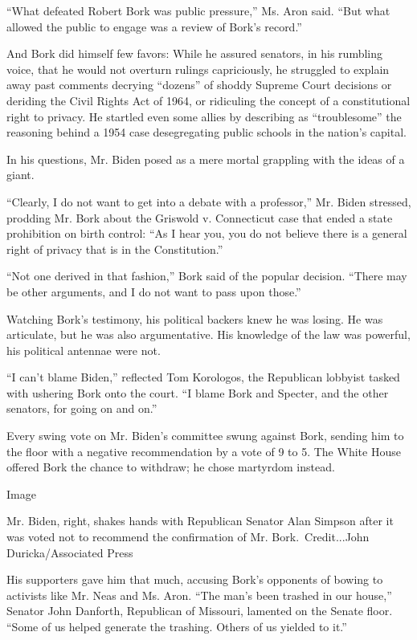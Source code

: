 ``What defeated Robert Bork was public pressure,'' Ms. Aron said. ``But
what allowed the public to engage was a review of Bork's record.''

And Bork did himself few favors: While he assured senators, in his
rumbling voice, that he would not overturn rulings capriciously, he
struggled to explain away past comments decrying ``dozens'' of shoddy
Supreme Court decisions or deriding the Civil Rights Act of 1964, or
ridiculing the concept of a constitutional right to privacy. He startled
even some allies by describing as ``troublesome'' the reasoning behind a
1954 case desegregating public schools in the nation's capital.

In his questions, Mr. Biden posed as a mere mortal grappling with the
ideas of a giant.

``Clearly, I do not want to get into a debate with a professor,'' Mr.
Biden stressed, prodding Mr. Bork about the Griswold v. Connecticut case
that ended a state prohibition on birth control: ``As I hear you, you do
not believe there is a general right of privacy that is in the
Constitution.''

``Not one derived in that fashion,'' Bork said of the popular decision.
``There may be other arguments, and I do not want to pass upon those.''

Watching Bork's testimony, his political backers knew he was losing. He
was articulate, but he was also argumentative. His knowledge of the law
was powerful, his political antennae were not.

``I can't blame Biden,'' reflected Tom Korologos, the Republican
lobbyist tasked with ushering Bork onto the court. ``I blame Bork and
Specter, and the other senators, for going on and on.''

Every swing vote on Mr. Biden's committee swung against Bork, sending
him to the floor with a negative recommendation by a vote of 9 to 5. The
White House offered Bork the chance to withdraw; he chose martyrdom
instead.

Image

Mr. Biden, right, shakes hands with Republican Senator Alan Simpson
after it was voted not to recommend the confirmation of Mr.
Bork.~Credit...John Duricka/Associated Press

His supporters gave him that much, accusing Bork's opponents of bowing
to activists like Mr. Neas and Ms. Aron. ``The man's been trashed in our
house,'' Senator John Danforth, Republican of Missouri, lamented on the
Senate floor. ``Some of us helped generate the trashing. Others of us
yielded to it.''


